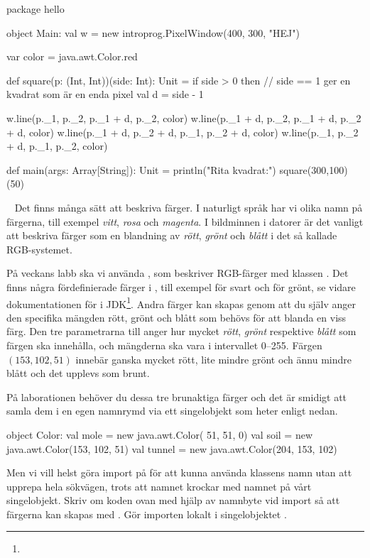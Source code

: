 \SubtaskSolved
\begin{Code}
package hello

object Main:
  val w = new introprog.PixelWindow(400, 300, "HEJ")

  var color = java.awt.Color.red

  def square(p: (Int, Int))(side: Int): Unit =
    if side > 0 then
      // side == 1 ger en kvadrat som är en enda pixel
      val d = side - 1  
      
      w.line(p._1,     p._2,     p._1 + d, p._2,     color)
      w.line(p._1 + d, p._2,     p._1 + d, p._2 + d, color)
      w.line(p._1 + d, p._2 + d, p._1,     p._2 + d, color)
      w.line(p._1,     p._2 + d, p._1,     p._2,     color)

  def main(args: Array[String]): Unit =
    println("Rita kvadrat:")
    square(300,100)(50)

\end{Code}


\QUESTEND




\QUESTBEGIN

\Task \what~ Det finns många sätt att beskriva färger.
I naturligt språk har vi olika namn på färgerna, till exempel \emph{vitt}, \emph{rosa} och \emph{magenta}.
I bildminnen i datorer är det vanligt att beskriva färger som en blandning av \emph{rött}, \emph{grönt} och \emph{blått} i det så kallade RGB-systemet.

På veckans labb ska vi använda , som beskriver RGB-färger med klassen .
Det finns några fördefinierade färger i , till exempel  för svart och  för grönt, se vidare dokumentationen för  i JDK\footnote{\JDKApiUrl}.
Andra färger kan skapas genom att du själv anger den specifika mängden rött, grönt och blått som behövs för att blanda en viss färg.
Den tre parametrarna till  anger hur mycket \emph{rött}, \emph{grönt} respektive \emph{blått} som färgen ska innehålla, och mängderna ska vara i intervallet 0--255.
Färgen $(153, 102, 51)$ innebär ganska mycket rött, lite mindre grönt och ännu mindre blått och det upplevs som brunt.


\Subtask
På laborationen behöver du dessa tre brunaktiga färger och det är smidigt att samla dem i en egen namnrymd via ett singelobjekt som heter  enligt nedan.
\begin{Code}
object Color:
  val mole   = new java.awt.Color( 51,  51,   0)
  val soil   = new java.awt.Color(153, 102,  51)
  val tunnel = new java.awt.Color(204, 153, 102)
\end{Code}
\noindent Men vi vill helst göra import på  för att kunna använda klassens namn utan att upprepa hela sökvägen, trots att namnet krockar med namnet på vårt singelobjekt. Skriv om koden ovan med hjälp av namnbyte vid import så att färgerna kan skapas med . Gör importen lokalt i singelobjektet .



